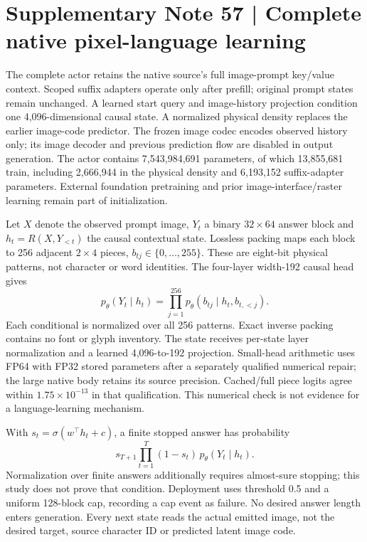 \clearpage
\section*{Supplementary Note 57 | Complete native pixel-language learning}
\label{note:complete-pixel}
The complete actor retains the native source's full image-prompt key/value
context. Scoped suffix adapters operate only after prefill; original prompt
states remain unchanged. A learned start query and image-history projection
condition one 4,096-dimensional causal state. A normalized physical density
replaces the earlier image-code predictor. The frozen image codec encodes
observed history only; its image decoder and previous prediction flow are
disabled in output generation. The actor contains 7,543,984,691 parameters,
of which 13,855,681 train, including 2,666,944 in the physical density and
6,193,152 suffix-adapter parameters. External foundation pretraining and prior
image-interface/raster learning remain part of initialization.

Let $X$ denote the observed prompt image, $Y_t$ a binary $32\times64$ answer
block and $h_t=R(X,Y_{<t})$ the causal contextual state. Lossless packing
maps each block to 256 adjacent $2\times4$ pieces, $b_{tj}\in\{0,\ldots,255\}$.
These are eight-bit physical patterns, not character or word identities.
The four-layer width-192 causal head gives
\[
 p_\theta(Y_t\mid h_t)=\prod_{j=1}^{256}
 p_\theta(b_{tj}\mid h_t,b_{t,<j}).
\]
Each conditional is normalized over all 256 patterns. Exact inverse packing
contains no font or glyph inventory. The state receives per-state layer
normalization and a learned 4,096-to-192 projection. Small-head arithmetic
uses FP64 with FP32 stored parameters after a separately qualified numerical
repair; the large native body retains its source precision. Cached/full
piece logits agree within $1.75\times10^{-13}$ in that qualification. This
numerical check is not evidence for a language-learning mechanism.

With $s_t=\sigma(w^\top h_t+c)$, a finite stopped answer has probability
\[
 s_{T+1}\prod_{t=1}^{T}(1-s_t)\,p_\theta(Y_t\mid h_t).
\]
Normalization over finite answers additionally requires almost-sure stopping;
this study does not prove that condition. Deployment uses threshold 0.5 and
a uniform 128-block cap, recording a cap event as failure. No desired answer
length enters generation. Every next state reads the actual emitted image,
not the desired target, source character ID or predicted latent image code.

